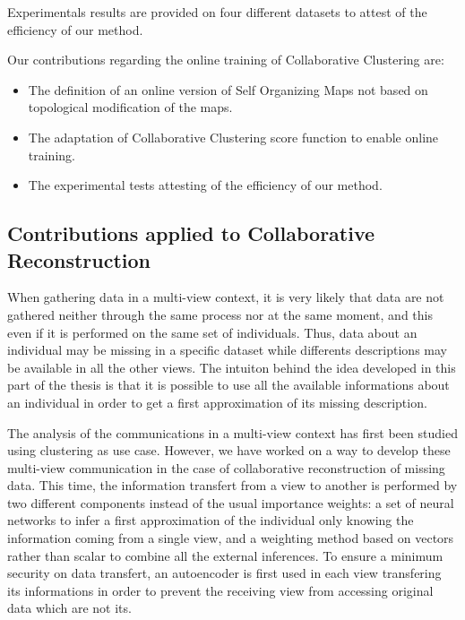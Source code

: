 Experimentals results are provided on four different datasets to attest of the efficiency of our method.

Our contributions regarding the online training of Collaborative Clustering are:
\begin{itemize}
    \item The definition of an online version of Self Organizing Maps not based on topological modification of the maps.
    \item The adaptation of Collaborative Clustering score function to enable online training.
    \item The experimental tests attesting of the efficiency of our method.
\end{itemize}

\subsection{Contributions applied to Collaborative Reconstruction}

When gathering data in a multi-view context, it is very likely that data are not gathered neither through the same process nor at the same moment, and this even if it is performed on the same set of individuals. Thus, data about an individual may be missing in a specific dataset while differents descriptions may be available in all the other views. The intuiton behind the idea developed in this part of the thesis is that it is possible to use all the available informations about an individual in order to get a first approximation of its missing description.

The analysis of the communications in a multi-view context has first been studied using clustering as use case. However, we have worked on a way to develop these multi-view communication in the case of collaborative reconstruction of missing data. This time, the information transfert from a view to another is performed by two different components instead of the usual importance weights: a set of neural networks to infer a first approximation of the individual only knowing the information coming from a single view, and a weighting method based on vectors rather than scalar to combine all the external inferences. To ensure a minimum security on data transfert, an autoencoder is first used in each view transfering its informations in order to prevent the receiving view from accessing original data which are not its.

